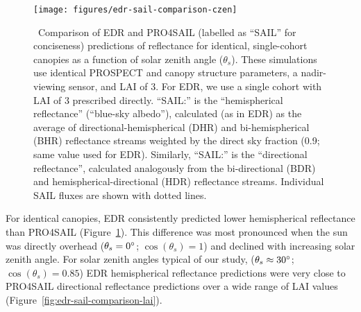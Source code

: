 \begin{figure}
  \centering
  \texttt{[image: figures/edr-sail-comparison-czen]}
  \caption{\label{fig:edr-sail-comparison-czen}\
    Comparison of EDR and PRO4SAIL (labelled as ``SAIL'' for conciseness) predictions of reflectance for identical, single-cohort canopies as a function of solar zenith angle ($\theta_{s}$).
    These simulations use identical PROSPECT and canopy structure parameters, a nadir-viewing sensor, and LAI of 3.
    For EDR, we use a single cohort with LAI of 3 prescribed directly.\@
    ``SAIL:\@HR'' is the ``hemispherical reflectance'' (``blue-sky albedo''), calculated (as in EDR) as the average of directional-hemispherical (DHR) and bi-hemispherical (BHR) reflectance streams weighted by the direct sky fraction (0.9; same value used for EDR).
    Similarly, ``SAIL:\@DR'' is the ``directional reflectance'', calculated analogously from the bi-directional (BDR) and hemispherical-directional (HDR) reflectance streams.
    Individual SAIL fluxes are shown with dotted lines.
  }
\end{figure}

For identical canopies, EDR consistently predicted lower hemispherical reflectance than PRO4SAIL (Figure~\ref{fig:edr-sail-comparison-czen}).
This difference was most pronounced when the sun was directly overhead ($\theta_{s} = 0^{\circ}$; $\cos(\theta_{s}) = 1$) and declined with increasing solar zenith angle.
For solar zenith angles typical of our study, ($\theta_{s} \approx 30^{\circ}$; $\cos(\theta_{s}) = 0.85$) EDR hemispherical reflectance predictions were very close to PRO4SAIL directional reflectance predictions over a wide range of LAI values (Figure~\ref{fig:edr-sail-comparison-lai}).
